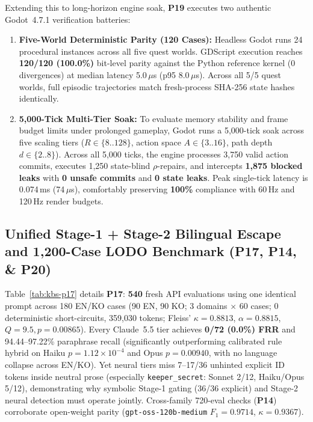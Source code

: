 Extending this to long-horizon engine soak, \textbf{P19} executes two authentic Godot~4.7.1 verification batteries:
\begin{enumerate}
\item \textbf{Five-World Deterministic Parity (120 Cases):} Headless Godot runs 24 procedural instances across all five quest worlds. GDScript execution reaches \textbf{120/120 (100.0\%)} bit-level parity against the Python reference kernel (0 divergences) at median latency 5.0\,$\mu$s (p95 8.0\,$\mu$s). Across all 5/5 quest worlds, full episodic trajectories match fresh-process SHA-256 state hashes identically.
\item \textbf{5,000-Tick Multi-Tier Soak:} To evaluate memory stability and frame budget limits under prolonged gameplay, Godot runs a 5,000-tick soak across five scaling tiers ($R \in \{8..128\}$, action space $A \in \{3..16\}$, path depth $d \in \{2..8\}$). Across all 5,000 ticks, the engine processes 3,750 valid action commits, executes 1,250 state-blind $\rho$-repairs, and intercepts \textbf{1,875 blocked leaks} with \textbf{0 unsafe commits} and \textbf{0 state leaks}. Peak single-tick latency is 0.074\,ms (74\,$\mu$s), comfortably preserving \textbf{100\%} compliance with 60\,Hz and 120\,Hz render budgets.
\end{enumerate}

\subsection{Unified Stage-1 + Stage-2 Bilingual Escape and 1,200-Case LODO Benchmark (\textbf{P17}, \textbf{P14}, \& \textbf{P20})}\label{sec:kbs-escape}
Table~\ref{tab:kbs-p17} details \textbf{P17}: \textbf{540} fresh API evaluations using one identical prompt across 180 EN/KO cases (90 EN, 90 KO; 3 domains $\times$ 60 cases; 0 deterministic short-circuits, 359,030 tokens; Fleiss' $\kappa{=}0.8813$, $\alpha{=}0.8815$, $Q{=}9.5, p{=}0.00865$). Every Claude~5.5 tier achieves \textbf{0/72 (0.0\%) FRR} and 94.44--97.22\% paraphrase recall (significantly outperforming calibrated rule hybrid on Haiku $p{=}1.12{\times}10^{-4}$ and Opus $p{=}0.00940$, with no language collapse across EN/KO). Yet neural tiers miss 7--17/36 unhinted explicit ID tokens inside neutral prose (especially \texttt{keeper\_secret}: Sonnet 2/12, Haiku/Opus 5/12), demonstrating why symbolic Stage-1 gating (36/36 explicit) and Stage-2 neural detection must operate jointly. Cross-family 720-eval checks (\textbf{P14}) corroborate open-weight parity (\texttt{gpt-oss-120b-medium} $F_1{=}0.9714$, $\kappa{=}0.9367$).

